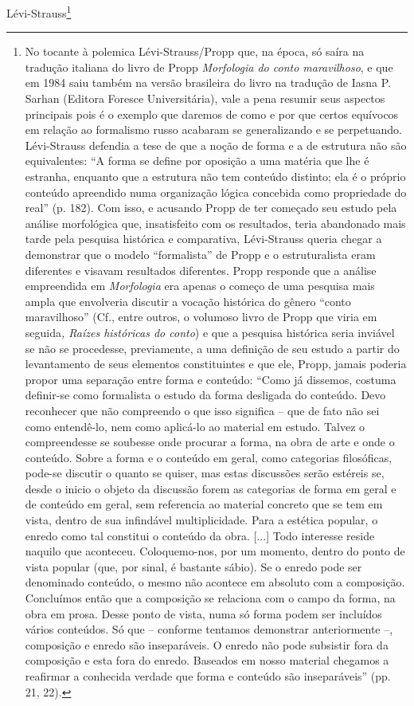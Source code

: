 Lévi-Strauss\footnote{No tocante à polemica Lévi-Strauss/Propp que, na
  época, só saíra na tradução italiana do livro de Propp
  \emph{Morfologia do conto maravilhoso}, e que em 1984 saiu também na
  versão brasileira do livro na tradução de Iasna P. Sarhan (Editora
  Foresce Universitária), vale a pena resumir seus aspectos principais
  pois é o exemplo que daremos de como e por que certos equívocos em
  relação ao formalismo russo acabaram se generalizando e se
  perpetuando. Lévi-Strauss defendia a tese de que a noção de forma e a
  de estrutura não são equivalentes: ``A forma se define por oposição a
  uma matéria que lhe é estranha, enquanto que a estrutura não tem
  conteúdo distinto; ela é o próprio conteúdo apreendido numa
  organização lógica concebida como propriedade do real'' (p. 182). Com
  isso, e acusando Propp de ter começado seu estudo pela análise
  morfológica que, insatisfeito com os resultados, teria abandonado mais
  tarde pela pesquisa histórica e comparativa, Lévi-Strauss queria
  chegar a demonstrar que o modelo ``formalista'' de Propp e o
  estruturalista eram diferentes e visavam resultados diferentes. Propp
  responde que a análise empreendida em \emph{Morfologia} era apenas o
  começo de uma pesquisa mais ampla que envolveria discutir a vocação
  histórica do gênero ``conto maravilhoso'' (Cf., entre outros, o
  volumoso livro de Propp que viria em seguida\emph{, Raízes históricas
  do conto}) e que a pesquisa histórica seria inviável se não se
  procedesse, previamente, a uma definição de seu estudo a partir do
  levantamento de seus elementos constituintes e que ele, Propp, jamais
  poderia propor uma separação entre forma e conteúdo: ``Como já
  dissemos, costuma definir-se como formalista o estudo da forma
  desligada do conteúdo. Devo reconhecer que não compreendo o que isso
  significa -- que de fato não sei como entendê-lo, nem como aplicá-lo
  ao material em estudo. Talvez o compreendesse se soubesse onde
  procurar a forma, na obra de arte e onde o conteúdo. Sobre a forma e o
  conteúdo em geral, como categorias filosóficas, pode-se discutir o
  quanto se quiser, mas estas discussões serão estéreis se, desde o
  inicio o objeto da discussão forem as categorias de forma em geral e
  de conteúdo em geral, sem referencia ao material concreto que se tem
  em vista, dentro de sua infindável multiplicidade. Para a estética
  popular, o enredo como tal constitui o conteúdo da obra. {[}...{]}
  Todo interesse reside naquilo que aconteceu. Coloquemo-nos, por um
  momento, dentro do ponto de vista popular (que, por sinal, é bastante
  sábio). Se o enredo pode ser denominado conteúdo, o mesmo não acontece
  em absoluto com a composição. Concluímos então que a composição se
  relaciona com o campo da forma, na obra em prosa. Desse ponto de
  vista, numa só forma podem ser incluídos vários conteúdos. Só que --
  conforme tentamos demonstrar anteriormente --, composição e enredo são
  inseparáveis. O enredo não pode subsistir fora da composição e esta
  fora do enredo. Baseados em nosso material chegamos a reafirmar a
  conhecida verdade que forma e conteúdo são inseparáveis'' (pp. 21,
  22).

}
